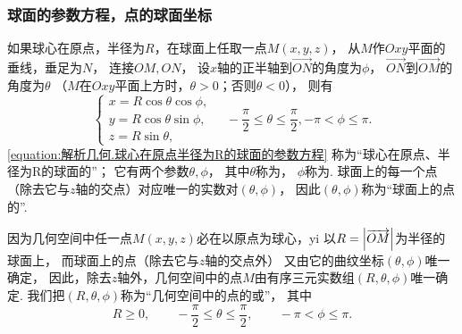\subsubsection{球面的参数方程，点的球面坐标}
如果球心在原点，半径为\(R\)，在球面上任取一点\(M(x,y,z)\)，
从\(M\)作\(Oxy\)平面的垂线，垂足为\(N\)，
连接\(OM,ON\)，
设\(x\)轴的正半轴到\(\vec{ON}\)的角度为\(\phi\)，
\(\vec{ON}\)到\(\vec{OM}\)的角度为\(\theta\)
（\(M\)在\(Oxy\)平面上方时，\(\theta>0\)；否则\(\theta<0\)），
则有
\begin{equation}\label{equation:解析几何.球心在原点半径为R的球面的参数方程}
	\left\{ \begin{array}{l}
		x = R \cos\theta \cos\phi, \\
		y = R \cos\theta \sin\phi, \\
		z = R \sin\theta,
	\end{array} \right.
	\quad
	-\frac{\pi}{2} \leq \theta \leq \frac{\pi}{2},
	-\pi < \phi \leq \pi.
\end{equation}
\cref{equation:解析几何.球心在原点半径为R的球面的参数方程}
称为“球心在原点、半径为R的球面的”；
它有两个参数\(\theta,\phi\)，
其中\(\theta\)称为，
\(\phi\)称为.
球面上的每一个点（除去它与\(z\)轴的交点）对应唯一的实数对\((\theta,\phi)\)，
因此\((\theta,\phi)\)称为“球面上的点的”.

因为几何空间中任一点\(M(x,y,z)\)必在以原点为球心，yi
以\(R=\abs{\overrightarrow{OM}}\)为半径的球面上，
而球面上的点（除去它与\(z\)轴的交点外）
又由它的曲纹坐标\((\theta,\phi)\)唯一确定，
因此，除去\(z\)轴外，几何空间中的点\(M\)由有序三元实数组\((R,\theta,\phi)\)唯一确定.
我们把\((R,\theta,\phi)\)称为“几何空间中的点的或”，
其中\[
	R \geq 0,
	\qquad
	-\frac{\pi}{2} \leq \theta \leq \frac{\pi}{2},
	\qquad
	-\pi < \phi \leq \pi.
\]

